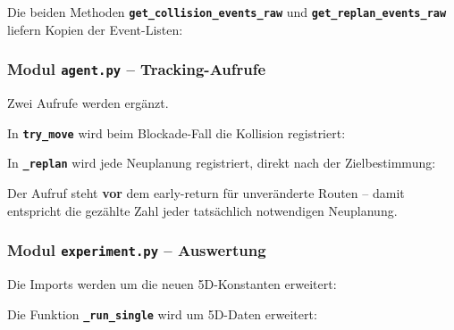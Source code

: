 Die beiden Methoden \textbf{\texttt{get\_collision\_events\_raw}} und \textbf{\texttt{get\_replan\_events\_raw}} liefern Kopien der Event-Listen:




\subsubsection{Modul \texttt{agent.py} – Tracking-Aufrufe}

Zwei Aufrufe werden ergänzt.

In \textbf{\texttt{try\_move}} wird beim Blockade-Fall die Kollision registriert:



In \textbf{\texttt{\_replan}} wird jede Neuplanung registriert, direkt nach der Zielbestimmung:



Der Aufruf steht \textbf{vor} dem early-return für unveränderte Routen -- damit entspricht die gezählte Zahl jeder tatsächlich notwendigen Neuplanung.


\subsubsection{Modul \texttt{experiment.py} – Auswertung}

Die Imports werden um die neuen 5D-Konstanten erweitert:



Die Funktion \textbf{\texttt{\_run\_single}} wird um 5D-Daten erweitert:

